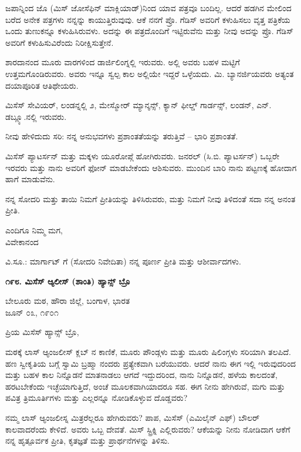 ಜಪಾನ್ನಿಂದ ಜೊ (ಮಿಸ್ ಜೋಸೆಫಿನ್ ಮಾಕ್ಲಿಯಾಡ್)ನಿಂದ ಯಾವ ಪತ್ರವೂ ಬಂದಿಲ್ಲ. ಆದರೆ ಹಡಗಿನ ಮೇಲಿಂದ ಬರೆದ ಅನೇಕ ಪತ್ರಗಳು ನನ್ನನ್ನು ಕಾಯುತ್ತಿರುವುವು. ಆಕೆ ನನಗೆ ಪ್ರೊ. ಗೆಡಿಸ್ ಅವರಿಗೆ ಕಳುಹಿಸಲು ವೃತ್ತ ಪತ್ರಿಕೆಯ ಒಂದು ತುಣುಕನ್ನೂ ಕಳುಹಿಸಿರುವಳು. ಅದನ್ನು ಈ ಪತ್ರದೊಂದಿಗೆ ಇಟ್ಟಿರುವೆನು ಮತ್ತು ನೀವು ಅದನ್ನು ಪ್ರೊ. ಗೆಡಿಸ್ ಅವರಿಗೆ ಕಳುಹಿಸುವಿರೆಂದು ನಿರೀಕ್ಷಿಸುತ್ತೇನೆ.

ಶಾರದಾನಂದ ಮೂರು ವಾರಗಳಿಂದ ಡಾರ್ಜಿಲಿಂಗ್ನಲ್ಲಿ ಇರುವರು. ಅಲ್ಲಿ ಅವರು ಬಹಳ ಮಟ್ಟಿಗೆ ಉತ್ತಮಗೊಂಡಿರುವರು. ಅವರು ಇನ್ನೂ ಸ್ವಲ್ಪ ಕಾಲ ಅಲ್ಲಿಯೇ ಇದ್ದರೆ ಒಳ್ಳೆಯದು. ಮಿ. ಬ್ಯಾನರ್ಜಿಯವರು ಅತ್ಯಂತ ದಯಾಪೂರಿತ ಆತಿಥೇಯರು.

ಮಿಸೆಸ್ ಸೇವಿಯರ್, ಲಂಡನ್ನಲ್ಲಿ ೨, ಮೇಸ್ಮೋರ್ ಮ್ಯಾನ್ಶನ್ಸ್, ಕ್ಯಾನ್ ಫೀಲ್ಡ್ ಗಾರ್ಡನ್ಸ್, ಲಂಡನ್, ಎನ್. ಡಬ್ಲ್ಯೂ.‌ನಲ್ಲಿ ಇರುವರು.

ನೀವು ಹೇಳಿದುದು ಸರಿ: ನನ್ನ ಅನುಭವಗಳು ಪ್ರಶಾಂತತೆಯನ್ನು ತರುತ್ತಿವೆ – ಭಾರಿ ಪ್ರಶಾಂತತೆ.

ಮಿಸೆಸ್ ಪ್ಯಾಟರ್ಸನ್ ಮತ್ತು ಮಕ್ಕಳು ಯೂರೋಪ್ಗೆ ಹೋಗಿರುವರು. ಜನರಲ್ (ಸಿ.ಬಿ. ಪ್ಯಾಟರ್ಸನ್) ಒಬ್ಬರೇ ಇರವರು ಮತ್ತು ನಾನು ಅವರಿಗೆ ಫೋನ್ ಮಾಡಬೇಕೆಂದು ಆಶಿಸುವರು. ಮುಂದಿನ ಬಾರಿ ನಾನು ಪಟ್ಟಣಕ್ಕೆ ಹೋದಾಗ ಹಾಗೆ ಮಾಡುವೆನು.

ನನ್ನ ಸೋದರಿ ಮತ್ತು ತಾಯಿ ನಿಮಗೆ ಪ್ರೀತಿಯನ್ನು ತಿಳಿಸಿರುವರು, ಮತ್ತು ನಿಮಗೆ ನೀವು ತಿಳಿದಂತೆ ಸದಾ ನನ್ನ ಅನಂತ ಪ್ರೀತಿ.

\begin{flushright}
ಎಂದಿಗೂ ನಿಮ್ಮ ಮಗ,\\ವಿವೇಕಾನಂದ
\end{flushright}

ವಿ.ಸೂ.: ಮಾರ್ಗಾಟ್ ಗೆ (ಸೋದರಿ ನಿವೇದಿತಾ) ನನ್ನ ಪೂರ್ಣ ಪ್ರೀತಿ ಮತ್ತು ಆಶೀರ್ವಾದಗಳು.

\begin{center}
\textbf{೧೯೮. ಮಿಸೆಸ್ ಆ್ಯಲೀಸ್ (ಶಾಂತಿ) ಹ್ಯಾನ್ಸ್ ಬ್ರೊ}
\end{center}

\begin{flushright}
ಬೇಲೂರು ಮಠ, ಹೌರಾ ಜಿಲ್ಲೆ, ಬಂಗಾಳ, ಭಾರತ\\ಜೂನ್ ೦೩, ೧೯೦೧
\end{flushright}

ಪ್ರಿಯ ಮಿಸೆಸ್ ಹ್ಯಾನ್ಸ್ ಬ್ರೊ,

ಮಠಕ್ಕೆ ಲಾಸ್ ಆ್ಯಂಜಲೀಸ್ ಕ್ಲಬ್ ನ ಕಾಣಿಕೆ, ಮೂರು ಪೌಂಡ್ಗಳು ಮತ್ತು ಮೂರು ಷಿಲಿಂಗ್ಗಳು ಸರಿಯಾಗಿ ತಲಪಿದೆ. ಹಣ ಸ್ವೀಕೃತಿಯ ಬಗ್ಗೆ ಸ್ವಾಮಿ ಬ್ರಹ್ಮಾ ನಂದರು ಪ್ರತ್ಯೇಕವಾಗಿ ಬರೆಯುವರು. ಆದರೆ ನಾನು ಈಗ ಇಲ್ಲಿ ಇರುವುದರಿಂದ ಮತ್ತು ಬಹಳ ಕಾಲ ನಿನ್ನೊಡನೆ ಮಾತನಾಡಲು ಆಗದೆ ಇದ್ದುದರಿಂದ, ನಾನು ನಿನ್ನೊಡನೆ, ಹಳೆಯ ಕಾಲದಂತೆ, ಹರಟಬೇಕೆಂದು ಇಚ್ಛೆಯಾಗುತ್ತಿದೆ, ಅಂಚೆ ಮೂಲಕವಾಗಿಯಾದರೂ ಸಹ. ಈಗ ನೀನು ಹೇಗಿರುವೆ, ಮಗು ಮತ್ತು ಪವಿತ್ರ ತ್ರಿಮೂರ್ತಿಗಳು ಮತ್ತು ಎಲ್ಲರನ್ನೂ ನೋಡಿಕೊಳ್ಳುವ ದೊಡ್ಡವರು?

ನಮ್ಮ ಲಾಸ್ ಆ್ಯಂಜಲೀಸ್ನ ಮಿತ್ರರೆಲ್ಲರೂ ಹೇಗಿರುವರು? ಪಾಪ, ಮಿಸೆಸ್ (ಎಮಿಲೈನ್ ಎಫ್) ಬೌಲರ್ ಕಾಲವಾದರೆಂದು ಕೇಳಿದೆ. ಅವರು ಒಬ್ಬ ದೇವತೆ. ಮಿಸ್ ಸ್ಟ್ರಿಕ್ನಿ ಎಲ್ಲಿರುವರು? ಆಕೆಯನ್ನು ನೀನು ನೋಡಿದಾಗ ಆಕೆಗೆ ನನ್ನ ಹೃತ್ಪೂರ್ವಕ ಪ್ರೀತಿ, ಕೃತಜ್ಞತೆ ಮತ್ತು ಪ್ರಾರ್ಥನೆಗಳನ್ನು ತಿಳಿಸು.

